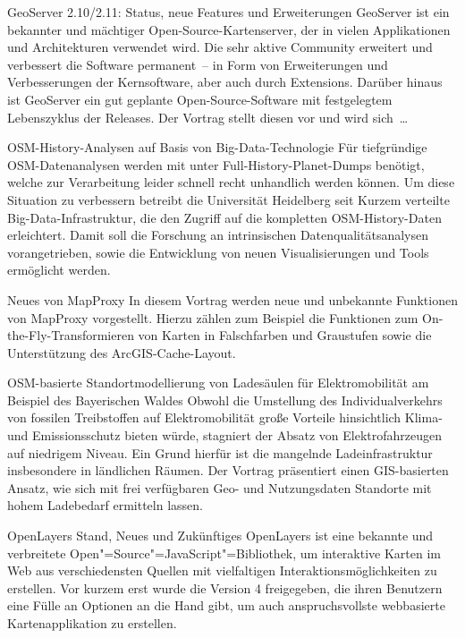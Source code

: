 %
{GeoServer 2.10/2.11: Status, neue Features und Erweiterungen}%
{}%
{GeoServer ist ein bekannter und mächtiger Open-Source-Kartenserver, der in
vielen Applikationen und Architek\-turen verwendet wird.
Die sehr aktive Community erweitert und verbessert die Software
permanent~-- in Form von Erweiterungen und Verbesserungen der Kernsoftware, aber
auch durch Extensions.
Darüber hinaus ist GeoServer ein gut geplante Open-Source-Software mit
festgelegtem Lebenszyklus der Releases. Der Vortrag
stellt diesen vor und wird
sich~\dots %
}


%
{OSM-History-Analysen auf Basis von Big-Data-Technologie}%
{}%
{Für tiefgründige OSM-Datenanalysen werden mit unter Full-History-Planet-Dumps benötigt, welche zur
Verarbeitung leider schnell recht unhandlich werden können. Um diese Situation zu verbessern
betreibt die Universität Heidelberg seit Kurzem verteilte Big-Data-Infrastruktur, die den Zugriff
auf die kompletten OSM-History-Daten erleichtert. Damit soll die Forschung an intrinsischen
Datenqualitätsanalysen vorangetrieben, sowie die Entwicklung von neuen Visualisierungen und Tools
ermöglicht werden.}%

%
{Neues von MapProxy}%
{}%
{In diesem Vortrag werden neue und unbekannte Funktionen von MapProxy vorgestellt. Hierzu zählen zum
Beispiel die Funktionen zum On-the-Fly-Transformieren von Karten in Falschfarben und Graustufen
sowie die Unterstützung des ArcGIS-Cache-Layout.}

%
{OSM-basierte Standortmodellierung von Ladesäulen für Elektromobilität am Beispiel des Bayerischen Waldes}%
{}%
{Obwohl die Umstellung des Individualverkehrs von fossilen Treibstoffen auf Elektromobilität große
Vorteile hinsichtlich Klima- und Emissionsschutz bieten würde, stagniert der Absatz von
Elektrofahrzeugen auf niedrigem Niveau. Ein Grund hierfür ist die mangelnde Ladeinfrastruktur
insbesondere in ländlichen Räumen. Der Vortrag präsentiert einen GIS-basierten Ansatz, wie sich mit
frei verfügbaren Geo- und Nutzungsdaten Standorte mit hohem Ladebedarf ermitteln lassen.}

%
{OpenLayers}%
{Stand, Neues und Zukünftiges}%
{OpenLayers ist eine bekannte und verbreitete
Open"=Source"=JavaScript"=Bibliothek, um interaktive Karten im Web aus
verschiedensten Quellen mit vielfaltigen Interaktionsmöglichkeiten zu
erstellen. Vor kurzem erst wurde die Version 4 freigegeben, die ihren
Benutzern eine Fülle an Optionen an die Hand gibt, um auch
anspruchsvollste webbasierte Kartenapplikation zu erstellen.}

